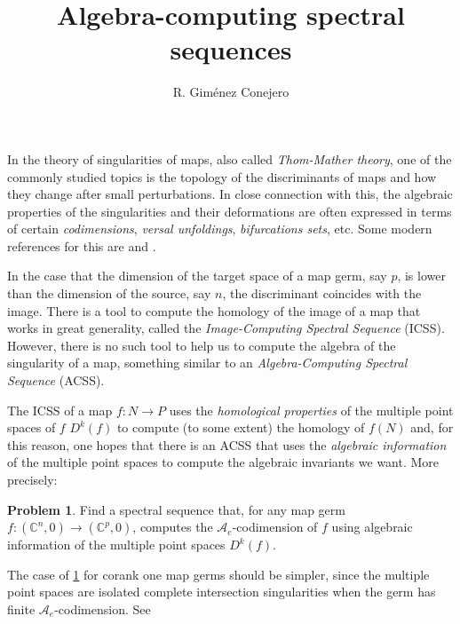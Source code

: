 \documentclass[a4paper,11pt]{amsart}
\theoremstyle{plain}
\theoremstyle{definition}
\newtheorem{problem}[theorem]{Problem}
\begin{document}
\author{R. Giménez Conejero}
\title{Algebra-computing spectral sequences}


\maketitle


In the theory of singularities of maps, also called \textsl{Thom-Mather theory}, one of the commonly studied topics is the topology of the discriminants of maps and how they change after small perturbations. In close connection with this, the algebraic properties of the singularities and their deformations are often expressed in terms of certain \textsl{codimensions}, \textsl{versal unfoldings}, \textsl{bifurcations sets}, etc. Some modern references for this are \cite{Mond2020} and \cite[Chapter 2]{HB3}.

In the case that the dimension of the target space of a map germ, say $p$, is lower than the dimension of the source, say $n$, the discriminant coincides with the image. There is a tool to compute the homology of the image of a map that works in great generality, called the \textit{Image-Computing Spectral Sequence} (ICSS). However, there is no such tool to help us to compute the algebra of the singularity of a map, something similar to an \textsl{Algebra-Computing Spectral Sequence} (ACSS).

The ICSS of a map $f:N\rightarrow P$ uses the \textsl{homological properties} of the multiple point spaces of $f$ $D^k(f)$ to compute (to some extent) the homology of $f(N)$ and, for this reason, one hopes that there is an ACSS that uses the \textsl{algebraic information} of the multiple point spaces to compute the algebraic invariants we want. More precisely:

\begin{problem}\label{prob:ACSS}
Find a spectral sequence that, for any map germ $f:(\mathbb{C}^n,0)\rightarrow(\mathbb{C}^p,0)$, computes the $\mathscr{A}_e$-codimension of $f$ using algebraic information of the multiple point spaces $D^k(f)$.
\end{problem}

The case of \cref{prob:ACSS} for corank one map germs should be simpler, since the multiple point spaces are isolated complete intersection singularities when the germ has finite $\mathscr{A}_e$-codimension. See \cite[Proposition 2.14]{Marar1989}
\end{document}
